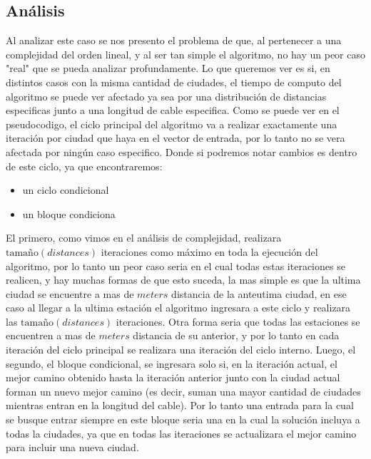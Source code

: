 \documentclass{article}
\theoremstyle{definition}
\theoremstyle{remark}
\begin{document}

\subsection{Análisis}

Al analizar este caso se nos presento el problema de que, al pertenecer a una complejidad del orden lineal, y al ser tan simple el algoritmo, no hay un peor caso "real" que se pueda analizar profundamente. Lo que queremos ver es si, en distintos casos con la misma cantidad de ciudades, el tiempo de computo del algoritmo se puede ver afectado ya sea por una distribución de distancias especificas junto a una longitud de cable especifica.
Como se puede ver en el pseudocodigo, el ciclo principal del algoritmo va a realizar exactamente una iteración por ciudad que haya en el vector de entrada, por lo tanto no se vera afectada por ningún caso especifico. Donde si podremos notar cambios es dentro de este ciclo, ya que encontraremos:
\begin{itemize}
\item un ciclo condicional
\item un bloque condiciona
\end{itemize}
El primero, como vimos en el análisis de complejidad, realizara $\text{tamaño}(distances)$ iteraciones como máximo en toda la ejecución del algoritmo, por lo tanto un peor caso seria en el cual todas estas iteraciones se realicen, y hay muchas formas de que esto suceda, la mas simple es que la ultima ciudad se encuentre a mas de $meters$ distancia de la anteutima ciudad, en ese caso al llegar a la ultima estación el algoritmo ingresara a este ciclo y realizara las $\text{tamaño}(distances)$ iteraciones. Otra forma seria que todas las estaciones se encuentren a mas de $meters$ distancia de su anterior, y por lo tanto en cada iteración del ciclo principal se realizara una iteración del ciclo interno.
Luego, el segundo, el bloque condicional, se ingresara solo si, en la iteración actual, el mejor camino obtenido hasta la iteración anterior junto con la ciudad actual forman un nuevo mejor camino (es decir, suman una mayor cantidad de ciudades mientras entran en la longitud del cable). Por lo tanto una entrada para la cual se busque entrar siempre en este bloque seria una en la cual la solución incluya a todas la ciudades, ya que en todas las iteraciones se actualizara el mejor camino para incluir una nueva ciudad.\par
\end{document}
